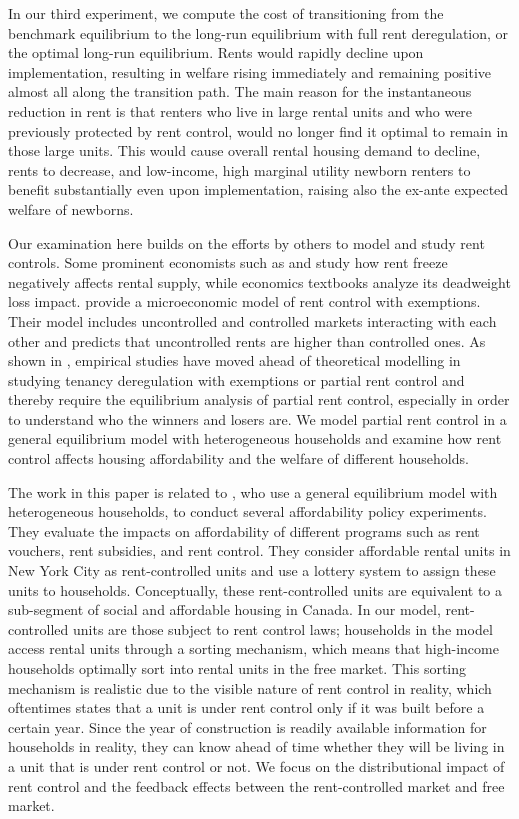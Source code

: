 \documentclass[parskip=full]{article}
\begin{document}
In our third experiment, we compute the cost of transitioning from the benchmark equilibrium to the long-run equilibrium with full rent deregulation, or the optimal long-run equilibrium. Rents would rapidly decline upon implementation, resulting in welfare rising immediately and remaining positive almost all along the transition path. The main reason for the instantaneous reduction in rent is that renters who live in large rental units and who were previously protected by rent control, would no longer find it optimal to remain in those large units. This would cause overall rental housing demand to decline, rents to decrease, and low-income, high marginal utility newborn renters to benefit substantially even upon implementation, raising also the ex-ante expected welfare of newborns.

Our examination here builds on the efforts by others to model and study rent controls. Some prominent economists such as \citet{hayek-1929} and \citet{fs-1946} study how rent freeze negatively affects rental supply, while economics textbooks analyze its deadweight loss impact. \citet{fallis-1985} provide a microeconomic model of rent control with exemptions. Their model includes uncontrolled and controlled markets interacting with each other and predicts that uncontrolled rents are higher than controlled ones. As shown in \citet{diamond-2019}, empirical studies have moved ahead of theoretical modelling in studying tenancy deregulation with exemptions or partial rent control and thereby require the equilibrium analysis of partial rent control, especially in order to understand who the winners and losers are. We model partial rent control in a general equilibrium model with heterogeneous households and examine how rent control affects housing affordability and the welfare of different households.

The work in this paper is related to \citet{fmn-2022}, who use a general equilibrium model with heterogeneous households, to conduct several affordability policy experiments. They evaluate the impacts on affordability of different programs such as rent vouchers, rent subsidies, and rent control. They consider affordable rental units in New York City as rent-controlled units and use a lottery system to assign these units to households. Conceptually, these rent-controlled units are equivalent to a sub-segment of social and affordable housing in Canada. In our model, rent-controlled units are those subject to rent control laws; households in the model access rental units through a sorting mechanism, which means that high-income households optimally sort into rental units in the free market. This sorting mechanism is realistic due to the visible nature of rent control in reality, which oftentimes states that a unit is under rent control only if it was built before a certain year. Since the year of construction is readily available information for households in reality, they can know ahead of time whether they will be living in a unit that is under rent control or not. We focus on the distributional impact of rent control and the feedback effects between the rent-controlled market and free market. 
\end{document}
